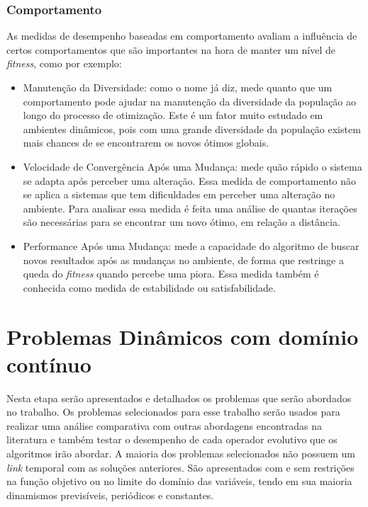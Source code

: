 \subsubsection{Comportamento}
As medidas de desempenho baseadas em comportamento avaliam a influência de certos comportamentos que são importantes na hora de manter um nível de \textit{fitness}, como por exemplo:

\begin{itemize}
\item Manutenção da Diversidade: como o nome já diz, mede quanto que um comportamento pode ajudar na manutenção da diversidade da população ao longo do processo de otimização. Este é um fator muito estudado em ambientes dinâmicos, pois com uma grande diversidade da população existem mais chances de se encontrarem os novos ótimos globais.

\item Velocidade de Convergência Após uma Mudança: mede quão rápido o sistema se adapta após perceber uma alteração. Essa medida de comportamento não se aplica a sistemas que tem dificuldades em perceber uma alteração no ambiente. Para analisar essa medida é feita uma análise de quantas iterações são necessárias para se encontrar um novo ótimo, em relação a distância.

\item Performance Após uma Mudança: mede a capacidade do algoritmo de buscar novos resultados após as mudanças no ambiente, de forma que restringe a queda do \textit{fitness} quando percebe uma piora. Essa medida também é conhecida como medida de estabilidade ou satisfabilidade.
\end{itemize}

\section{Problemas Dinâmicos com domínio contínuo}
\label{sec:revisao_dinamic_problems}
Nesta etapa serão apresentados e detalhados os problemas que serão abordados no trabalho. Os problemas selecionados para esse trabalho serão usados para realizar uma análise comparativa com outras abordagens encontradas na literatura e também testar o desempenho de cada operador evolutivo que os algoritmos irão abordar.
A maioria dos problemas selecionados não possuem um \textit{link} temporal com as soluções anteriores. São apresentados com e sem restrições na função objetivo ou no limite do domínio das variáveis, tendo em sua maioria dinamismos previsíveis, periódicos e constantes.

